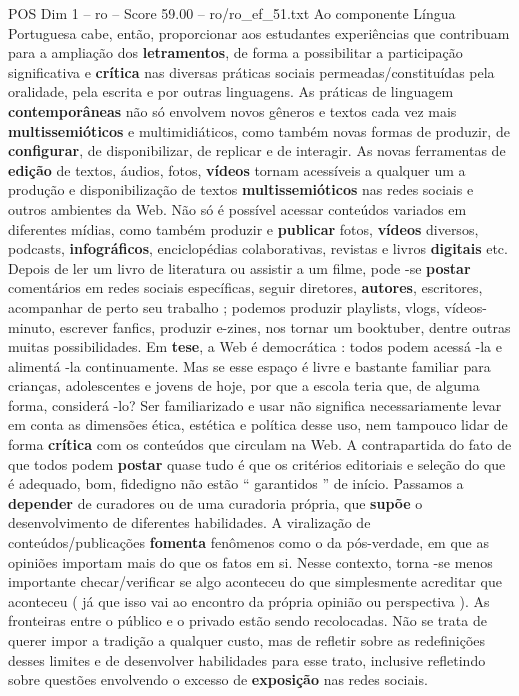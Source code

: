\begin{textsample}{POS Dim 1 – ro – Score 59.00 – ro/ro\_ef\_51.txt}
Ao componente Língua Portuguesa cabe, então, proporcionar aos estudantes experiências que contribuam para a ampliação dos \textbf{letramentos}, de forma a possibilitar a participação significativa e \textbf{crítica} nas diversas práticas sociais permeadas/constituídas pela oralidade, pela escrita e por outras linguagens.
As práticas de linguagem \textbf{contemporâneas} não só envolvem novos gêneros e textos cada vez mais \textbf{multissemióticos} e multimidiáticos, como também novas formas de produzir, de \textbf{configurar}, de disponibilizar, de replicar e de interagir.
As novas ferramentas de \textbf{edição} de textos, áudios, fotos, \textbf{vídeos} tornam acessíveis a qualquer um a produção e disponibilização de textos \textbf{multissemióticos} nas redes sociais e outros ambientes da Web.
Não só é possível acessar conteúdos variados em diferentes mídias, como também produzir e \textbf{publicar} fotos, \textbf{vídeos} diversos, podcasts, \textbf{infográficos}, enciclopédias colaborativas, revistas e livros \textbf{digitais} etc.
Depois de ler um livro de literatura ou assistir a um filme, pode -se \textbf{postar} comentários em redes sociais específicas, seguir diretores, \textbf{autores}, escritores, acompanhar de perto seu trabalho ; podemos produzir playlists, vlogs, vídeos-minuto, escrever fanfics, produzir e-zines, nos tornar um booktuber, dentre outras muitas possibilidades.
Em \textbf{tese}, a Web é democrática : todos podem acessá -la e alimentá -la continuamente.
Mas se esse espaço é livre e bastante familiar para crianças, adolescentes e jovens de hoje, por que a escola teria que, de alguma forma, considerá -lo?
Ser familiarizado e usar não significa necessariamente levar em conta as dimensões ética, estética e política desse uso, nem tampouco lidar de forma \textbf{crítica} com os conteúdos que circulam na Web.
A contrapartida do fato de que todos podem \textbf{postar} quase tudo é que os critérios editoriais e seleção do que é adequado, bom, fidedigno não estão “ garantidos ” de início.
Passamos a \textbf{depender} de curadores ou de uma curadoria própria, que \textbf{supõe} o desenvolvimento de diferentes habilidades.
A viralização de conteúdos/publicações \textbf{fomenta} fenômenos como o da pós-verdade, em que as opiniões importam mais do que os fatos em si.
Nesse contexto, torna -se menos importante checar/verificar se algo aconteceu do que simplesmente acreditar que aconteceu ( já que isso vai ao encontro da própria opinião ou perspectiva ).
As fronteiras entre o público e o privado estão sendo recolocadas.
Não se trata de querer impor a tradição a qualquer custo, mas de refletir sobre as redefinições desses limites e de desenvolver habilidades para esse trato, inclusive refletindo sobre questões envolvendo o excesso de \textbf{exposição} nas redes sociais.

\end{textsample}
